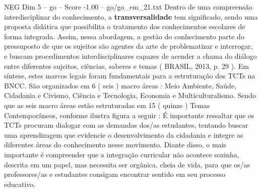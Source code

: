 \begin{textsample}{NEG Dim 5 – go – Score -1.00 – go/go\_em\_21.txt}
Dentro de uma compreensão interdisciplinar do conhecimento, a \textbf{transversalidade} tem significado, sendo uma proposta didática que possibilita o tratamento dos conhecimentos escolares de forma integrada.
Assim, nessa abordagem, a gestão do conhecimento parte do pressuposto de que os sujeitos são agentes da arte de problematizar e interrogar, e buscam procedimentos interdisciplinares capazes de acender a chama do diálogo entre diferentes sujeitos, ciências, saberes e temas ( BRASIL, 2013, p. 29 ).
Em síntese, estes marcos legais foram fundamentais para a estruturação dos TCTs na BNCC.
São organizados em 6 ( seis ) macro áreas : Meio Ambiente, Saúde, Cidadania e Civismo, Ciência e Tecnologia, Economia e Multiculturalismo.
Sendo que as seis macro áreas estão estruturadas em 15 ( quinze ) Temas Contemporâneos, conforme ilustra figura a seguir : É importante ressaltar que os TCTs procuram dialogar com as demandas dos/as estudantes, tentando buscar uma aprendizagem que evidencie o desenvolvimento da cidadania e integre as diferentes áreas do conhecimento nesse movimento.
Diante disso, o mais importante é compreender que a integração curricular não acontece sozinha, descrita em um papel, mas necessita ser orgânica, cheia de vida, para que os/as professores/as e estudantes consigam encontrar sentido em seu processo educativo.

\end{textsample}
